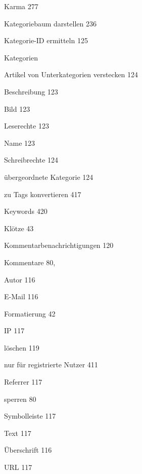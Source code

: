 \documentclass{book}
\renewcommand\subitem{\par}
\begin{document}
\begin{multicols}{2}
\begin{osp-index}
  \item Karma\hspace{1mm} 277
  \item Kategoriebaum darstellen\hspace{1mm} 236
  \item Kategorie-ID ermitteln\hspace{1mm} 125
  \item Kategorien\hspace{1mm} 
    \subitem Artikel von Unterkategorien verstecken\hspace{1mm} 124
    \subitem Beschreibung\hspace{1mm} 123
    \subitem Bild\hspace{1mm} 123
    \subitem Leserechte\hspace{1mm} 123
    \subitem Name\hspace{1mm} 123
    \subitem Schreibrechte\hspace{1mm} 124
    \subitem \"ubergeordnete Kategorie\hspace{1mm} 124
    \subitem zu Tags konvertieren\hspace{1mm} 417
  \item Keywords\hspace{1mm} 420
  \item Kl\"otze\hspace{1mm} 43
  \item Kommentarbenachrichtigungen\hspace{1mm} 120
  \item Kommentare\hspace{1mm} 80, 
    \subitem Autor\hspace{1mm} 116
    \subitem E-Mail\hspace{1mm} 116
    \subitem Formatierung\hspace{1mm} 42
    \subitem IP\hspace{1mm} 117
    \subitem l\"oschen\hspace{1mm} 119
    \subitem nur f\"ur registrierte Nutzer\hspace{1mm} 411
    \subitem Referrer\hspace{1mm} 117
    \subitem sperren\hspace{1mm} 80
    \subitem Symbolleiste\hspace{1mm} 117
    \subitem Text\hspace{1mm} 117
    \subitem \"Uberschrift\hspace{1mm} 116
    \subitem URL\hspace{1mm} 117

\end{osp-index}
\end{multicols}
\end{document}
